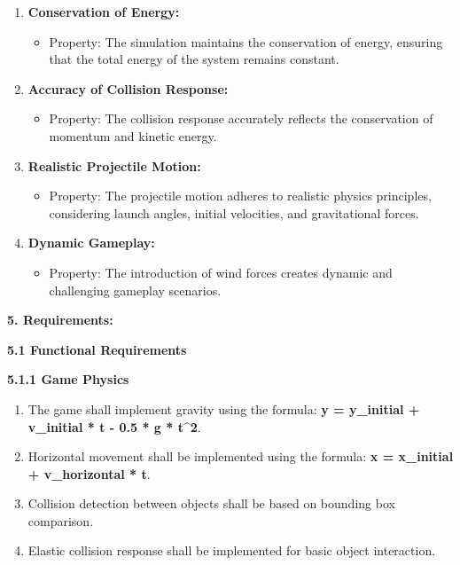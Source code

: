 \documentclass[
]{article}
\begin{document}
\begin{enumerate}
\def\labelenumi{\arabic{enumi}.}
\item
  \textbf{Conservation of Energy:}

  \begin{itemize}
  \item
    Property: The simulation maintains the conservation of energy,
    ensuring that the total energy of the system remains constant.
  \end{itemize}
\item
  \textbf{Accuracy of Collision Response:}

  \begin{itemize}
  \item
    Property: The collision response accurately reflects the
    conservation of momentum and kinetic energy.
  \end{itemize}
\item
  \textbf{Realistic Projectile Motion:}

  \begin{itemize}
  \item
    Property: The projectile motion adheres to realistic physics
    principles, considering launch angles, initial velocities, and
    gravitational forces.
  \end{itemize}
\item
  \textbf{Dynamic Gameplay:}

  \begin{itemize}
  \item
    Property: The introduction of wind forces creates dynamic and
    challenging gameplay scenarios.
  \end{itemize}
\end{enumerate}

\textbf{5. Requirements:}

\textbf{5.1 Functional Requirements}

\textbf{5.1.1 Game Physics}

\begin{enumerate}
\def\labelenumi{\arabic{enumi}.}
\item
  The game shall implement gravity using the formula: \textbf{y =
  y\_initial + v\_initial * t - 0.5 * g * t\^{}2}.
\item
  Horizontal movement shall be implemented using the formula: \textbf{x
  = x\_initial + v\_horizontal * t}.
\item
  Collision detection between objects shall be based on bounding box
  comparison.
\item
  Elastic collision response shall be implemented for basic object
  interaction.
\end{enumerate}
\end{document}

